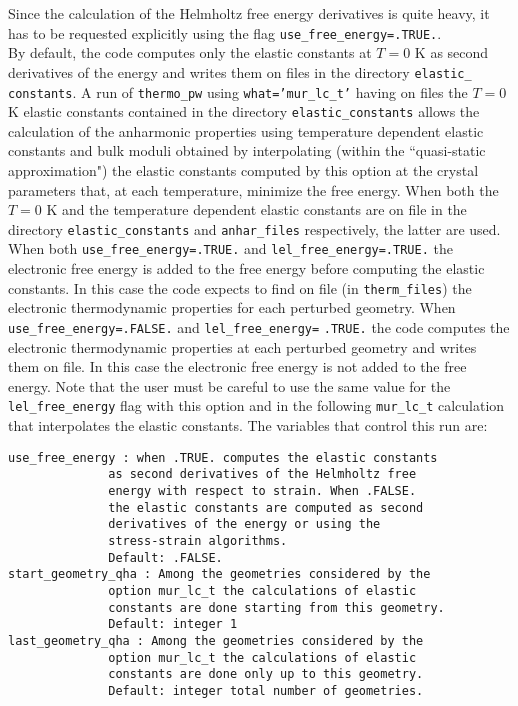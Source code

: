 \documentclass[12pt,a4paper,twoside]{report}
\begin{document}
Since the calculation of the Helmholtz free energy derivatives is
quite heavy, it has to be requested explicitly using the flag 
\texttt{use\_free\_energy=.TRUE.}. \\
By default, the code computes only the elastic constants at $T=0$ K
as second derivatives of the energy and writes them on files in the 
directory \texttt{elastic\_} \texttt{constants}. A run of \texttt{thermo\_pw} using 
\texttt{what='mur\_lc\_t'} having on files the $T=0$ K elastic constants
contained in the directory \texttt{elastic\_constants}
allows the calculation of the anharmonic properties using temperature
dependent elastic constants and bulk moduli obtained by interpolating 
(within the ``quasi-static approximation") the elastic constants computed 
by this option at the crystal parameters that, at each temperature, 
minimize the free energy. 
When both the $T=0$ K and the temperature dependent elastic constants
are on file in the directory \texttt{elastic\_constants} and 
\texttt{anhar\_files} respectively, the latter are used.
When both \texttt{use\_free\_energy=.TRUE.} and
\texttt{lel\_free\_energy=.TRUE.} the electronic free energy is
added to the free energy before computing the elastic constants. In this case 
the code expects to find on file (in \texttt{therm\_files}) the electronic 
thermodynamic properties for each perturbed geometry. When 
\texttt{use\_free\_energy=.FALSE.} and 
\texttt{lel\_free\_energy=} \texttt{.TRUE.} the code computes the electronic
thermodynamic properties at each perturbed geometry and writes them on 
file. In this case the electronic free energy is not added to the free
energy. Note that the user must be careful to use the same value for the
\texttt{lel\_free\_energy} flag with this option and in the following
\texttt{mur\_lc\_t} calculation that interpolates the elastic constants.
The variables that control this run are:

\begin{verbatim}
use_free_energy : when .TRUE. computes the elastic constants 
              as second derivatives of the Helmholtz free 
              energy with respect to strain. When .FALSE. 
              the elastic constants are computed as second 
              derivatives of the energy or using the 
              stress-strain algorithms.
              Default: .FALSE.
start_geometry_qha : Among the geometries considered by the 
              option mur_lc_t the calculations of elastic 
              constants are done starting from this geometry.
              Default: integer 1
last_geometry_qha : Among the geometries considered by the 
              option mur_lc_t the calculations of elastic 
              constants are done only up to this geometry.
              Default: integer total number of geometries.
\end{verbatim}
\end{document}
